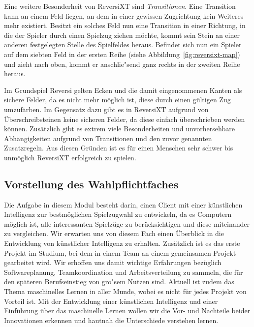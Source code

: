 Eine weitere Besonderheit von ReversiXT sind \emph{Transitionen}.
Eine Transition kann an einem Feld liegen, an dem in einer gewissen Zugrichtung kein Weiteres mehr existiert.
Besitzt ein solches Feld nun eine Transition in einer Richtung, in die der Spieler durch einen Spielzug ziehen m\"ochte, kommt sein Stein an einer anderen festgelegten Stelle des Spielfeldes heraus.
Befindet sich nun ein Spieler auf dem siebten Feld in der ersten Reihe (siehe Abbildung~\ref{fig:reversixt-map}) und zieht nach oben, kommt er anschlie"send ganz rechts in der zweiten Reihe heraus.

Im Grundspiel Reversi gelten Ecken und die damit eingenommenen Kanten als sichere Felder, da es nicht mehr m\"oglich ist, diese durch einen g\"ultigen Zug umzuf\"arben.
Im Gegensatz dazu gibt es in ReversiXT aufgrund von \"Uberschreibsteinen keine sicheren Felder, da diese einfach \"uberschrieben werden k\"onnen.
Zus\"atzlich gibt es extrem viele Besonderheiten und unvorhersehbare Abh\"angigkeiten aufgrund von Transitionen und den zuvor genannten Zusatzregeln.
Aus diesen Gr\"unden ist es f\"ur einen Menschen sehr schwer bis unm\"oglich ReversiXT erfolgreich zu spielen.

\subsection{Vorstellung des Wahlpflichtfaches}\label{subsec:vorstellung-des-wahlpflichtfaches}
Die Aufgabe in diesem Modul besteht darin, einen Client mit einer k\"unstlichen Intelligenz zur bestm\"oglichen Spielzugwahl zu entwickeln, da es Computern m\"oglich ist, alle interessanten Spielz\"uge zu ber\"ucksichtigen und diese miteinander zu vergleichen.
Wir erwarten uns von diesem Fach einen \"Uberblick in die Entwicklung von k\"unstlicher Intelligenz zu erhalten.
Zus\"atzlich ist es das erste Projekt im Studium, bei dem in einem Team an einem gemeinsamen Projekt gearbeitet wird.
Wir erhoffen uns damit wichtige Erfahrungen bez\"uglich Softwareplanung, Teamkoordination und Arbeitsverteilung zu sammeln, die f\"ur den sp\"ateren Berufseinstieg von gro"sem Nutzen sind.
Aktuell ist zudem das Thema maschinelles Lernen in aller Munde, wobei es nicht f\"ur jedes Projekt von Vorteil ist.
Mit der Entwicklung einer k\"unstlichen Intelligenz und einer Einf\"uhrung \"uber das maschinelle Lernen wollen wir die Vor- und Nachteile beider Innovationen erkennen und hautnah die Unterschiede verstehen lernen.


\bigskip
\newpage